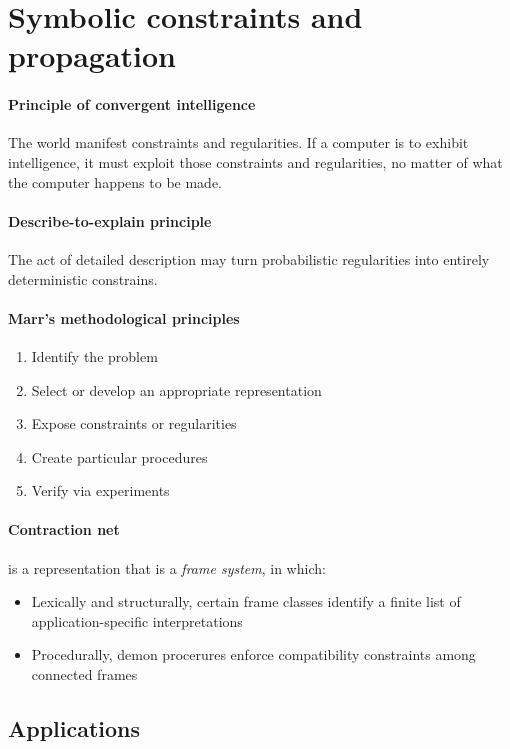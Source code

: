 \section{Symbolic constraints and propagation}

\paragraph{Principle of convergent intelligence} The world
manifest constraints and regularities. If a computer is to
exhibit intelligence, it must exploit those constraints and
regularities, no matter of what the computer happens to be made.

\paragraph{Describe-to-explain principle} The act of detailed
description may turn probabilistic regularities into entirely
deterministic constrains.

\paragraph{Marr's methodological principles}
\begin{enumerate}
  \item Identify the problem
  \item Select or develop an appropriate representation
  \item Expose constraints or regularities
  \item Create particular procedures 
  \item Verify via experiments
\end{enumerate}

\paragraph{Contraction net} is a representation that is a \textit{frame
system}, in which:
\begin{itemize}
  \item Lexically and structurally, certain frame classes
    identify a finite list of application-specific
    interpretations
  \item Procedurally, demon procerures enforce compatibility
    constraints among connected frames
\end{itemize}

\subsection{Applications}

